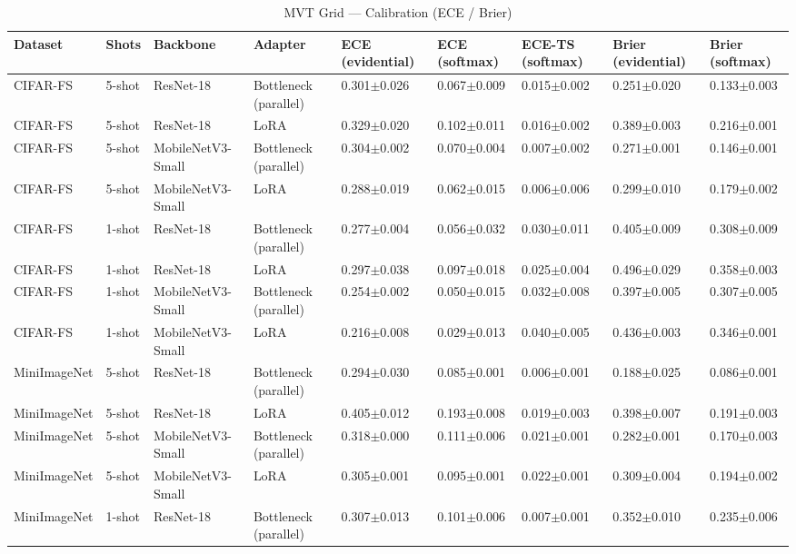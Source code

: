 \begin{table}[t]
\centering
\caption{MVT Grid — Calibration (ECE / Brier)}
\begin{tabular}{lllllllll}
\toprule
Dataset & Shots & Backbone & Adapter & ECE (evidential) & ECE (softmax) & ECE-TS (softmax) & Brier (evidential) & Brier (softmax) \\
\midrule
CIFAR-FS & 5-shot & ResNet-18 & Bottleneck (parallel) & 0.301$\pm$0.026 & 0.067$\pm$0.009 & 0.015$\pm$0.002 & 0.251$\pm$0.020 & 0.133$\pm$0.003 \\
CIFAR-FS & 5-shot & ResNet-18 & LoRA & 0.329$\pm$0.020 & 0.102$\pm$0.011 & 0.016$\pm$0.002 & 0.389$\pm$0.003 & 0.216$\pm$0.001 \\
CIFAR-FS & 5-shot & MobileNetV3-Small & Bottleneck (parallel) & 0.304$\pm$0.002 & 0.070$\pm$0.004 & 0.007$\pm$0.002 & 0.271$\pm$0.001 & 0.146$\pm$0.001 \\
CIFAR-FS & 5-shot & MobileNetV3-Small & LoRA & 0.288$\pm$0.019 & 0.062$\pm$0.015 & 0.006$\pm$0.006 & 0.299$\pm$0.010 & 0.179$\pm$0.002 \\
CIFAR-FS & 1-shot & ResNet-18 & Bottleneck (parallel) & 0.277$\pm$0.004 & 0.056$\pm$0.032 & 0.030$\pm$0.011 & 0.405$\pm$0.009 & 0.308$\pm$0.009 \\
CIFAR-FS & 1-shot & ResNet-18 & LoRA & 0.297$\pm$0.038 & 0.097$\pm$0.018 & 0.025$\pm$0.004 & 0.496$\pm$0.029 & 0.358$\pm$0.003 \\
CIFAR-FS & 1-shot & MobileNetV3-Small & Bottleneck (parallel) & 0.254$\pm$0.002 & 0.050$\pm$0.015 & 0.032$\pm$0.008 & 0.397$\pm$0.005 & 0.307$\pm$0.005 \\
CIFAR-FS & 1-shot & MobileNetV3-Small & LoRA & 0.216$\pm$0.008 & 0.029$\pm$0.013 & 0.040$\pm$0.005 & 0.436$\pm$0.003 & 0.346$\pm$0.001 \\
MiniImageNet & 5-shot & ResNet-18 & Bottleneck (parallel) & 0.294$\pm$0.030 & 0.085$\pm$0.001 & 0.006$\pm$0.001 & 0.188$\pm$0.025 & 0.086$\pm$0.001 \\
MiniImageNet & 5-shot & ResNet-18 & LoRA & 0.405$\pm$0.012 & 0.193$\pm$0.008 & 0.019$\pm$0.003 & 0.398$\pm$0.007 & 0.191$\pm$0.003 \\
MiniImageNet & 5-shot & MobileNetV3-Small & Bottleneck (parallel) & 0.318$\pm$0.000 & 0.111$\pm$0.006 & 0.021$\pm$0.001 & 0.282$\pm$0.001 & 0.170$\pm$0.003 \\
MiniImageNet & 5-shot & MobileNetV3-Small & LoRA & 0.305$\pm$0.001 & 0.095$\pm$0.001 & 0.022$\pm$0.001 & 0.309$\pm$0.004 & 0.194$\pm$0.002 \\
MiniImageNet & 1-shot & ResNet-18 & Bottleneck (parallel) & 0.307$\pm$0.013 & 0.101$\pm$0.006 & 0.007$\pm$0.001 & 0.352$\pm$0.010 & 0.235$\pm$0.006 \\

\end{tabular}
\end{table}
